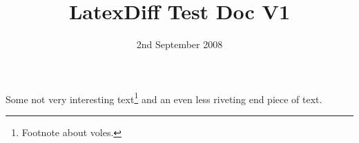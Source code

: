 \documentclass[11pt,a4paper,twoside,notitlepage]{article}
\title{LatexDiff Test Doc V1}
\date{2nd September 2008}
\begin{document}
\maketitle

Some not very interesting text\footnote{Footnote about voles.}
and an even less riveting end piece of text.
\end{document}
